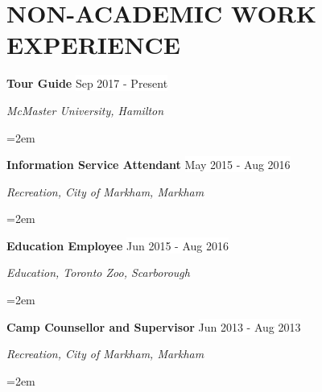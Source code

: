 \documentclass[paper=a4,fontsize=11pt]{scrartcl}	 			%
\newcommand{\NewPart}[1]{\section*{\uppercase{#1}}}
\newcommand{\EducationEntry}[4]{
		\noindent \textbf{#1} \hfill 					%
		\colorbox{White}{%
			\parbox{10em}{%
			\hfill\color{Black}#2}} \par				%
		\noindent \textit{#3} \par					%
		\noindent\hangindent=2em\hangafter=0 \small #4 	%
		\normalsize \par}
\newcommand{\WorkEntry}[4]{						%
		\noindent \textbf{#1} \hfill 					%
		\colorbox{White}{\color{Black}#2} \par		%
		\noindent \textit{#3} \par					%
		\noindent\hangindent=2em\hangafter=0 \small #4 	%
		\normalsize \par}
\newcommand{\RefEntry}[7]{						%
		\noindent \textbf{#1} \par 					%
		\noindent \textit{#2} \par	%
		\noindent \textit{#3} \par
		\noindent \textit{#4} \par%
		\noindent \textit{#5} \par
		\noindent \textit{#6} \par
		\noindent \textit{#7} \par
		}
\begin{document}
%
%
%
\NewPart{Non-Academic Work Experience}{}
\WorkEntry{Tour Guide}{Sep 2017 - Present}{McMaster University, Hamilton}{}
\WorkEntry{Information Service Attendant}{May 2015 - Aug 2016}{Recreation, City of Markham, Markham}{}
\WorkEntry{Education Employee}{Jun 2015 - Aug 2016}{Education, Toronto Zoo, Scarborough}{}
\WorkEntry{Camp Counsellor and Supervisor}{Jun 2013 - Aug 2013}{Recreation, City of Markham, Markham}{}
\end{document}
